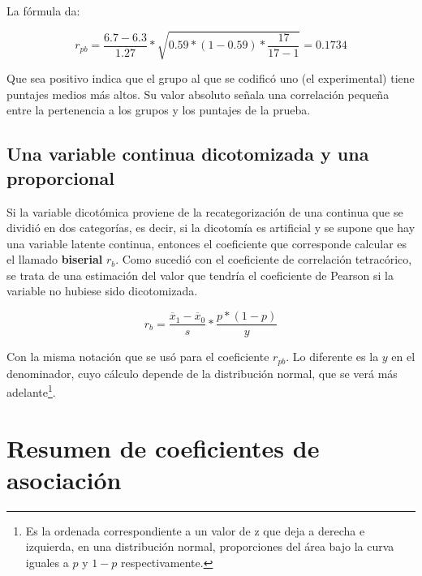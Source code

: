 \documentclass[]{book}
\let\rmarkdownfootnote\footnote%
\def\footnote{\protect\rmarkdownfootnote}
\begin{document}
La fórmula da:

\[r_{pb} = \frac{6.7 - 6.3}{1.27}*\sqrt{0.59*(1 - 0.59)*\frac{17}{17 - 1}} = 0.1734\]

Que sea positivo indica que el grupo al que se codificó uno (el
experimental) tiene puntajes medios más altos. Su valor absoluto señala una correlación pequeña entre la pertenencia a los grupos y los puntajes de la prueba.

\hypertarget{una-variable-continua-dicotomizada-y-una-proporcional}{%
\subsection{Una variable continua dicotomizada y una proporcional}\label{una-variable-continua-dicotomizada-y-una-proporcional}}

Si la variable dicotómica proviene de la recategorización de una
continua que se dividió en dos categorías, es decir, si la dicotomía es artificial y se supone que hay una variable latente continua, entonces el coeficiente que corresponde calcular es el llamado \textbf{biserial} \(r_{b}\). Como sucedió con el coeficiente de correlación tetracórico, se trata de una estimación del valor que tendría el coeficiente de Pearson si la variable no hubiese sido dicotomizada.

\[r_{b} = \frac{{\overline{x}}_{1} - {\overline{x}}_{0}}{s}*\frac{p*(1 - p)}{y}\]

Con la misma notación que se usó para el coeficiente \(r_{pb}\). Lo diferente es la \(y\) en el denominador, cuyo cálculo depende de la
distribución normal, que se verá más adelante\footnote{Es la ordenada correspondiente a un valor de z que deja a derecha e izquierda, en una distribución normal, proporciones del área bajo la curva iguales a \(p\) y \(1-p\) respectivamente.}.

\hypertarget{resumen-de-coeficientes-de-asociacion}{%
\section{Resumen de coeficientes de asociación}\label{resumen-de-coeficientes-de-asociacion}}
\end{document}
